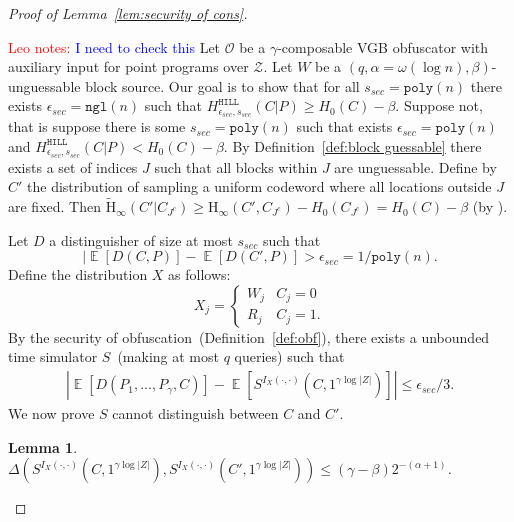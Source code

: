 \documentclass[11pt]{article}
\newcommand{\defref}[1]{\mbox{Definition~\ref{#1}}}
\newcommand{\lemref}[1]{\mbox{Lemma~\ref{#1}}}
\DeclareMathOperator*{\expe}{\mathbb{E}}
\newcommand{\hill}{\ensuremath{\mathtt{HILL}}\xspace}
\newcommand{\poly}{\ensuremath{\mathtt{poly}}\xspace}
\newcommand{\ngl}{\ensuremath{\mathtt{ngl}}\xspace}
\newcommand{\Hoo}{\mathrm{H}_\infty}
\newcommand{\Hav}{\tilde{\mathrm{H}}_\infty}
\newtheorem{lemma}[theorem]{Lemma}
\newcommand{\authnote}[2]{{\textcolor{red}{\textsf{#1 notes: }\textcolor{blue}{ #2}}\marginpar{\textcolor{red}{\textbf{!!!!!}}}}}
\newcommand{\authnote}[2]{}
\newcommand{\lnote}[1]{{\authnote{Leo}{#1}}}
\begin{document}
\begin{proof}[Proof of \lemref{lem:security of cons}]
\label{app:security of main cons}

\lnote{I need to check this}
Let $\mathcal{O}$ be a $\gamma$-composable VGB obfuscator with auxiliary input for point programs over $\mathcal{Z}$.  Let $W$ be a $(q, \alpha = \omega(\log n), \beta)$-unguessable block source.  Our goal is to show that for all $s_{sec} = \poly(n)$ there exists $\epsilon_{sec} =\ngl(n)$ such that $H^{\hill}_{\epsilon_{sec}, s_{sec}}(C|P)\geq H_0(C)- \beta$. %
Suppose not, that is suppose there is some $s_{sec} = \poly(n)$ such that exists $\epsilon_{sec} = \poly(n)$ and $H^{\hill}_{\epsilon_{sec}, s_{sec}}(C|P) < H_0(C)-\beta$.
By \defref{def:block guessable} there exists a set of indices $J$ such that all blocks within $J$ are unguessable.  Define by $C'$ the distribution of sampling a uniform codeword where all locations outside $J$ are fixed.  Then
$\Hav(C' | C_{J^c}) \ge \Hoo(C', C_{J^c}) - H_0(C_{J^c})  = H_0(C) - \beta$ (by \cite[Lemma 2.2b]{DBLP:journals/siamcomp/DodisORS08}).

Let $D$ a distinguisher of size at most $s_{sec}$ such that
\[
| \expe[D(C, P)] - \expe[D(C', P)] > \epsilon_{sec} = 1/\poly(n).
\]
Define the distribution $X$ as follows:
\[X_j =
\begin{cases}
W_j & C_j = 0\\
R_j & C_j = 1.
\end{cases}\]  By the security of obfuscation~(\defref{def:obf}), there exists a unbounded time simulator $S$~(making at most $q$ queries) such that
\begin{align}
\label{eq:dist before}
|\expe [D(P_1,..., P_\gamma, C)] - \expe [S^{I_X(\cdot, \cdot)}(C, 1^{\gamma \log |Z|})] |\leq \epsilon_{sec}/3.
\end{align}
We now prove $S$ cannot distinguish between $C$ and $C'$.
\begin{lemma}
\label{lem:sim cannot distinguish}
$\Delta(S^{I_X(\cdot, \cdot)}(C, 1^{\gamma \log |Z|}), S^{I_X(\cdot, \cdot)}(C', 1^{\gamma \log |Z|})) \le (\gamma-\beta) 2^{-(\alpha+1)}$.
\end{lemma}


\end{proof}
\end{document}
